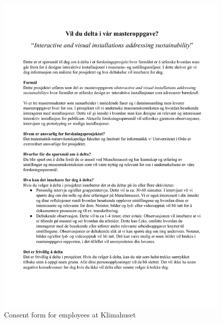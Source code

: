 \begin{figure}[H]
\includegraphics[width=12.5cm]{pictures/appendix/Samtykkeskjema Munch.docx.pdf}
\caption{Consent form for employees at Klimahuset}
\end{figure}

